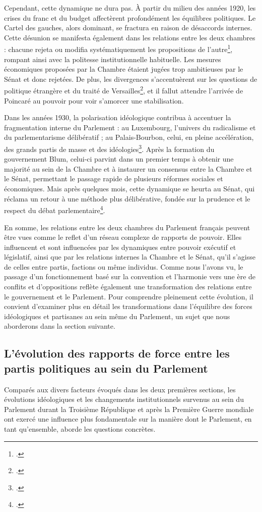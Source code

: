 \documentclass[a4paper,twoside,12pt]{book}
\begin{document}
Cependant, cette dynamique ne dura pas. À partir du milieu des années 1920, les crises du franc et du budget affectèrent profondément les équilibres politiques. Le Cartel des gauches, alors dominant, se fractura en raison de désaccords internes. Cette désunion se manifesta également dans les relations entre les deux chambres : chacune rejeta ou modifia systématiquement les propositions de l'autre\footcite[p.349]{zotero-515}, rompant ainsi avec la politesse institutionnelle habituelle. Les mesures économiques proposées par la Chambre étaient jugées trop ambitieuses par le Sénat et donc rejetées. De plus, les divergences s'accentuèrent sur les questions de politique étrangère et du traité de Versailles\footcite[p.235]{morel2024}, et il fallut attendre l'arrivée de Poincaré au pouvoir pour voir s'amorcer une stabilisation.

Dans les années 1930, la polarisation idéologique contribua à accentuer la fragmentation interne du Parlement : au Luxembourg, l'univers du radicalisme et du parlementarisme délibératif ; au Palais-Bourbon, celui, en pleine accélération, des grands partis de masse et des idéologies\footcite[p.237]{morel2024}. Après la formation du gouvernement Blum, celui-ci parvint dans un premier temps à obtenir une majorité au sein de la Chambre et à instaurer un consensus entre la Chambre et le Sénat, permettant le passage rapide de plusieurs réformes sociales et économiques. Mais après quelques mois, cette dynamique se heurta au Sénat, qui réclama un retour à une méthode plus délibérative, fondée sur la prudence et le respect du débat parlementaire\footcite[p.364]{zotero-515}.

En somme, les relations entre les deux chambres du Parlement français peuvent être vues comme le reflet d'un réseau complexe de rapports de pouvoir. Elles influencent et sont influencées par les dynamiques entre pouvoir exécutif et législatif, ainsi que par les relations internes la Chambre et le Sénat, qu'il s'agisse de celles entre partis, factions ou même individus. Comme nous l'avons vu, le passage d'un fonctionnement basé sur la convention et l'harmonie vers une ère de conflits et d'oppositions reflète également une transformation des relations entre le gouvernement et le Parlement. Pour comprendre pleinement cette évolution, il convient d'examiner plus en détail les transformations dans l'équilibre des forces idéologiques et partisanes au sein même du Parlement, un sujet que nous aborderons dans la section suivante.

\subsection{L'évolution des rapports de force entre les partis politiques au sein du Parlement}
Comparés aux divers facteurs évoqués dans les deux premières sections, les évolutions idéologiques et les changements institutionnels survenus au sein du Parlement durant la Troisième République et après la Première Guerre mondiale ont exercé une influence plus fondamentale sur la manière dont le Parlement, en tant qu'ensemble, aborde les questions concrètes.
\end{document}

